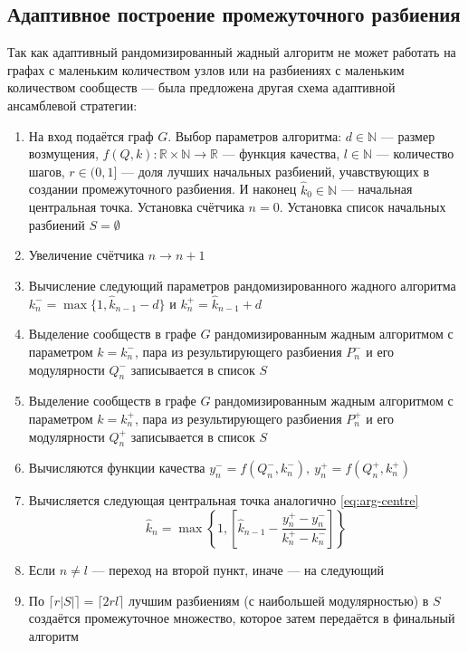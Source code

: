 
\subsection{Адаптивное построение промежуточного разбиения}

Так как адаптивный рандомизированный жадный алгоритм не может работать на графах с маленьким количеством узлов или на разбиениях с маленьким количеством сообществ --- была предложена другая схема адаптивной ансамблевой стратегии:

\begin{enumerate}
	\item На вход подаётся граф $G$. Выбор параметров алгоритма: $d \in \mathbb{N}$ --- размер возмущения, $f(Q, k): \mathbb{R} \times \mathbb{N} \rightarrow \mathbb{R}$ --- функция качества, $l \in \mathbb{N}$ --- количество шагов, $r \in (0, 1]$ --- доля лучших начальных разбиений, учавствующих в создании промежуточного разбиения. И наконец $\hat{k}_0 \in \mathbb{N}$ --- начальная центральная точка. Установка счётчика $n = 0$. Установка список начальных разбиений $S = \emptyset$
	\item Увеличение счётчика $n \rightarrow n + 1$
	\item Вычисление следующий параметров рандомизированного жадного алгоритма $k_n^{-} = \max\{1, \hat{k}_{n - 1} - d\}$ и $k_n^{+} = \hat{k}_{n - 1} + d$
	\item Выделение сообществ в графе $G$ рандомизированным жадным алгоритмом с параметром $k = k_n^{-}$, пара из результирующего разбиения $P_n^{-}$ и его модулярности $Q_n^{-}$ записывается в список $S$
	\item Выделение сообществ в графе $G$ рандомизированным жадным алгоритмом с параметром $k = k_n^{+}$, пара из результирующего разбиения $P_n^{+}$ и его модулярности $Q_n^{+}$ записывается в список $S$
	\item Вычисляются функции качества $y_n^{-} = f(Q_n^{-}, k_n^{-}),\ y_n^{+} = f(Q_n^{+}, k_n^{+})$
	\item Вычисляется следующая центральная точка аналогично \eqref{eq:arg-centre}
	\begin{equation}\label{eq:aes-centre}
		\hat{k}_n = \max\left\{1, \left[\hat{k}_{n - 1} - \frac{y_n^{+} - y_n^{-}}{k_n^{+} - k_n^{-}}\right]\right\}
	\end{equation}
	\item Если $n \ne l$ --- переход на второй пункт, иначе --- на следующий
	\item По $\lceil r|S| \rceil = \lceil 2rl \rceil$ лучшим разбиениям (с наибольшей модулярностью) в $S$ создаётся промежуточное множество, которое затем передаётся в финальный алгоритм
\end{enumerate}

